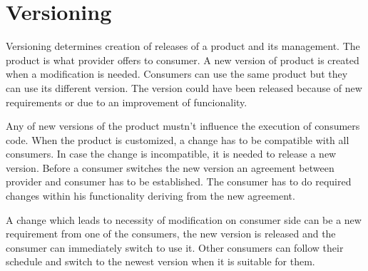 \chapter{Versioning}
\label{chap:versioning}

Versioning determines creation of releases of a product and its management. The product is what provider offers to consumer. A new version of product is created when a modification is needed. Consumers can use the same product but they can use its different version. The version could have been released because of new requirements or due to an improvement of funcionality. 

Any of new versions of the product mustn't influence the execution of consumers code. When the product is customized, a change has to be compatible with all consumers. In case the change is incompatible, it is needed to release a new version. Before a consumer switches the new version an agreement between provider and consumer has to be established. The consumer has to do required changes within his functionality deriving from the new agreement.

A change which leads to necessity of modification on consumer side can be a new requirement from one of the consumers, the new version is released and the consumer can immediately switch to use it. Other consumers can follow their schedule and switch to the newest version when it is suitable for them. 

